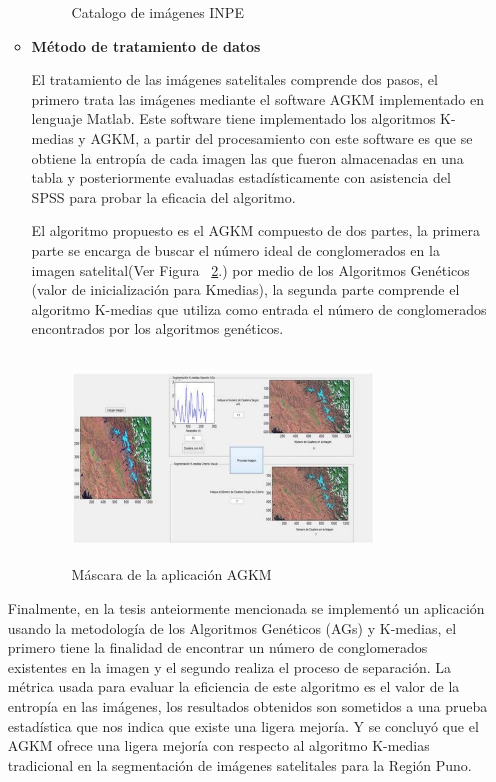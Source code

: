 \documentclass[10pt,journal]{IEEEtran}
\begin{document}
\begin{enumerate}
\begin{itemize}
\begin{figure}[H]
\begin{center}
            \caption{Catalogo de imágenes INPE}
            \label{f1} 
            \end{center}
    \end{figure}
    \item {\textbf{Método de tratamiento de datos}}\par
    El tratamiento de las imágenes satelitales comprende dos pasos, el primero trata las imágenes mediante el software AGKM implementado en lenguaje Matlab. Este software tiene implementado los algoritmos K-medias y AGKM, a partir del procesamiento con este software es que se obtiene la entropía de cada imagen las que fueron almacenadas en una tabla y posteriormente evaluadas estadísticamente con asistencia del SPSS para probar la eficacia del algoritmo. \par
    El algoritmo propuesto es el AGKM compuesto de dos partes, la primera parte se encarga de buscar el número ideal de conglomerados en la imagen satelital(Ver Figura ~\ref{f2}.) por medio de los Algoritmos Genéticos (valor de inicialización para Kmedias), la segunda parte comprende el algoritmo K-medias que utiliza como entrada el número de conglomerados encontrados por los algoritmos genéticos.
    \begin{figure}[H]
        \begin{center}
            \includegraphics[width=8cm, height=5.5cm]{figuras/2.JPG}
            \caption{Máscara de la aplicación AGKM}
            \label{f2} 
            \end{center}
    \end{figure}
\end{itemize}
Finalmente, en la tesis anteiormente mencionada se implementó un aplicación usando la metodología de los Algoritmos Genéticos (AGs) y K-medias, el primero tiene la finalidad de encontrar un número de conglomerados existentes en la imagen y el segundo realiza el proceso de separación. La métrica usada para evaluar la eficiencia de este algoritmo es el valor de la entropía en las imágenes, los resultados obtenidos son sometidos a una prueba estadística que nos indica que existe una ligera mejoría.
Y se concluyó que el AGKM ofrece una ligera mejoría con respecto al algoritmo K-medias tradicional en la segmentación de imágenes satelitales para la Región Puno.\par


\end{enumerate}
\end{document}
